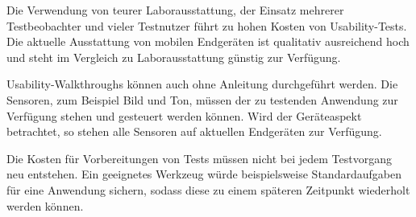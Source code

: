Die Verwendung von teurer Laborausstattung, der Einsatz mehrerer Testbeobachter und vieler Testnutzer führt zu hohen Kosten von Usability-Tests. Die aktuelle Ausstattung von mobilen Endgeräten ist qualitativ ausreichend hoch und steht im Vergleich zu Laborausstattung günstig zur Verfügung. 

Usability-Walkthroughs können auch ohne Anleitung durchgeführt werden. Die Sensoren, zum Beispiel Bild und Ton, müssen der zu testenden Anwendung zur Verfügung stehen und gesteuert werden können. Wird der Geräteaspekt betrachtet, so stehen alle Sensoren auf aktuellen Endgeräten zur Verfügung.

Die Kosten für Vorbereitungen von Tests müssen nicht bei jedem Testvorgang neu entstehen. Ein geeignetes Werkzeug würde beispielsweise Standardaufgaben für eine Anwendung sichern, sodass diese zu einem späteren Zeitpunkt wiederholt werden können. 

